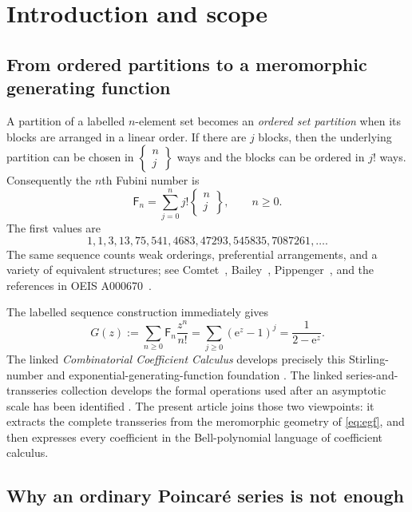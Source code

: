 \documentclass[11pt,a4paper]{article}
\theoremstyle{definition}
\theoremstyle{remark}
\newcommand{\Fub}{\mathsf F}
\newcommand{\Stirling}[2]{\left\{\!\!\begin{matrix}#1\\#2\end{matrix}\!\!\right\}}
\newcommand{\e}{\mathrm e}
\begin{document}
\tableofcontents
\newpage

\section{Introduction and scope}

\subsection{From ordered partitions to a meromorphic generating function}

A partition of a labelled \(n\)-element set becomes an \emph{ordered set
partition} when its blocks are arranged in a linear order.  If there are \(j\)
blocks, then the underlying partition can be chosen in
\(\Stirling{n}{j}\) ways and the blocks can be ordered in \(j!\) ways.
Consequently the \(n\)th Fubini number is
\begin{equation}\label{eq:def-fubini}
 \Fub_n=\sum_{j=0}^n j!\Stirling{n}{j},
 \qquad n\ge0.
\end{equation}
The first values are
\[
 1,1,3,13,75,541,4683,47293,545835,7087261,\ldots.
\]
The same sequence counts weak orderings, preferential arrangements, and a
variety of equivalent structures; see Comtet~\cite{Comtet},
Bailey~\cite{Bailey}, Pippenger~\cite{Pippenger}, and the references in
OEIS A000670~\cite{OEIS}.

The labelled sequence construction immediately gives
\begin{equation}\label{eq:egf}
 G(z):=\sum_{n\ge0}\Fub_n\frac{z^n}{n!}
 =\sum_{j\ge0}(\e^z-1)^j
 =\frac{1}{2-\e^z}.
\end{equation}
The linked \emph{Combinatorial Coefficient Calculus} develops precisely this
Stirling-number and exponential-generating-function foundation
\cite{ReshetnikovCCC}.  The linked series-and-transseries collection develops
the formal operations used after an asymptotic scale has been identified
\cite{ReshetnikovTransseries}.  The present article joins those two viewpoints:
it extracts the complete transseries from the meromorphic geometry of
\eqref{eq:egf}, and then expresses every coefficient in the Bell-polynomial
language of coefficient calculus.

\subsection{Why an ordinary Poincar\'e series is not enough}
\end{document}
